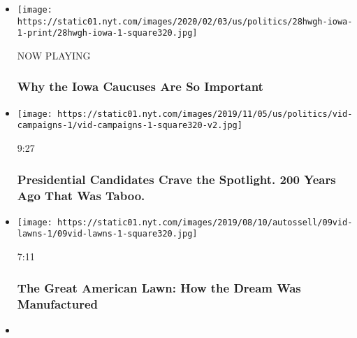\begin{itemize}
\item
  \texttt{[image: https://static01.nyt.com/images/2020/02/03/us/politics/28hwgh-iowa-1-print/28hwgh-iowa-1-square320.jpg]}

  NOW PLAYING

  \hypertarget{why-the-iowa-caucuses-are-so-important-2}{%
  \subsubsection{Why the Iowa Caucuses Are So
  Important}\label{why-the-iowa-caucuses-are-so-important-2}}
\item
  \href{https://www.nytimes.com/video/us/politics/100000006639814/presidential-candidates-campaigns.html?action=click\&module=video-series-bar\&region=header\&pgtype=Article\&playlistId=video/how-we-got-here}{}

  \texttt{[image: https://static01.nyt.com/images/2019/11/05/us/politics/vid-campaigns-1/vid-campaigns-1-square320-v2.jpg]}

  9:27

  \hypertarget{presidential-candidates-crave-the-spotlight-200-years-ago-that-was-taboo}{%
  \subsubsection{Presidential Candidates Crave the Spotlight. 200 Years
  Ago That Was
  Taboo.}\label{presidential-candidates-crave-the-spotlight-200-years-ago-that-was-taboo}}
\item
  \href{https://www.nytimes.com/video/us/100000006542254/climate-change-lawns.html?action=click\&module=video-series-bar\&region=header\&pgtype=Article\&playlistId=video/how-we-got-here}{}

  \texttt{[image: https://static01.nyt.com/images/2019/08/10/autossell/09vid-lawns-1/09vid-lawns-1-square320.jpg]}

  7:11

  \hypertarget{the-great-american-lawn-how-the-dream-was-manufactured}{%
  \subsubsection{The Great American Lawn: How the Dream Was
  Manufactured}\label{the-great-american-lawn-how-the-dream-was-manufactured}}
\item
  \href{https://www.nytimes.com/video/us/100000006456208/mexico-border-wall-immigration.html?action=click\&module=video-series-bar\&region=header\&pgtype=Article\&playlistId=video/how-we-got-here}{}


\end{itemize}
